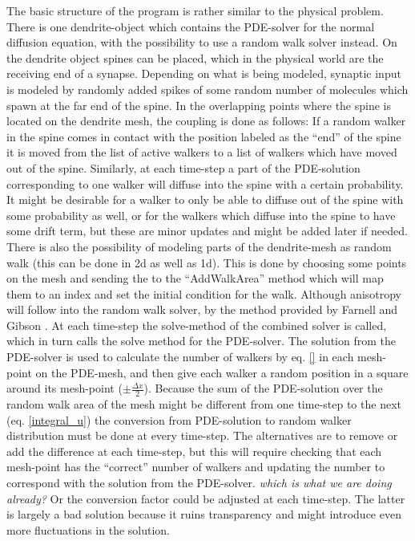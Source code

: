 The basic structure of the program is rather similar to the physical problem.
There is one dendrite-object which contains the PDE-solver for the normal diffusion equation, with the possibility to use a random walk solver instead. 
On the dendrite object spines can be placed, which in the physical world are the receiving end of a synapse. 
Depending on what is being modeled, synaptic input is modeled by randomly added spikes of some random number of molecules which spawn at the far end of the spine. 
In the overlapping points where the spine is located on the dendrite mesh, the coupling is done as follows: 
If a random walker in the spine comes in contact with the position labeled as the ``end'' of the spine it is moved from the list of active walkers to a list of walkers which have moved out of the spine. 
Similarly, at each time-step a part of the PDE-solution corresponding to one walker will diffuse into the spine with a certain probability. 
It might be desirable for a walker to only be able to diffuse out of the spine with some probability as well, or for the walkers which diffuse into the spine to have some drift term, but these are minor updates and might be added later if needed. \\

There is also the possibility of modeling parts of the dendrite-mesh as random walk (this can be done in 2d as well as 1d). 
This is done by choosing some points on the mesh and sending the to the ``AddWalkArea'' method which will map them to an index and set the initial condition for the walk. 
Although anisotropy will follow into the random walk solver, by the method provided by Farnell and Gibson \cite{farnell2005monte}. 
At each time-step the solve-method of the combined solver is called, which in turn calls the solve method for the PDE-solver. 
The solution from the PDE-solver is used to calculate the number of walkers by eq. \ref{} in each mesh-point on the PDE-mesh, and then give each walker a random position in a square around its mesh-point ($\pm \frac{\Delta x}{2}$). 
Because the sum of the PDE-solution over the random walk area of the mesh might be different from one time-step to the next (eq. \ref{integral_u}) the conversion from PDE-solution to random walker distribution must be done at every time-step. 
The alternatives are to remove or add the difference at each time-step, but this will require checking that each mesh-point has the ``correct'' number of walkers and updating the number to correspond with the solution from the PDE-solver. \emph{which is what we are doing already?}
Or the conversion factor could be adjusted at each time-step. The latter is largely a bad solution because it ruins transparency and might introduce even more fluctuations in the solution.


